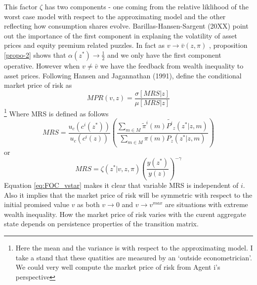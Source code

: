 \documentclass[12pt]{article}
\newtheorem{proposition}{Proposition}
\begin{document}


This factor $\zeta$ has two components - one coming from the relative liklihood of the worst case model with respect to the approximating model and the other reflecting how consumption shares evolve. Barillas-Hansen-Sargent (20XX) point out the importance of the first component in explaning the volatility of asset prices and equity premium related puzzles. In fact as $v\to \bar{v}(z,\pi)$ , proposition \ref{propo-2} shows that $\alpha(z^*)\to \frac{1}{2}$ and we only have the first component operative. However when $v\neq \bar{v}$ we have the feedback from wealth inequality to asset prices. 
Following Hansen and Jagannathan (1991), define the conditional market price of risk as 
\[MPR(v,z)=\frac{\sigma[MRS|z]}{\mu[MRS|z]}\] \footnote{Here the mean and the variance is with respect to the approximating model. I take a stand that these quatities are measured by an `outside econometrician'. We could very well compute the market price of risk from Agent i's perspective}
Where MRS is defined as follows
\[MRS=\frac{u_c(c^i(z^*))}{u_c(c^i(z))}\left(\frac{\sum_{m \in M}\tilde{\pi}^{i}(m)\tilde{P^i}_z(z^* |z,m)}{\sum_{m \in M}{\pi(m)P_{z}(z^*|z,m)}} \right)\] 
or
\begin{equation}
MRS=\zeta(z^*|v,z,\pi)\left(\frac{y(z^*)}{y(z)}\right)^{-\gamma}
\end{equation}
%
Equation \ref{eq:FOC_vstar} makes it clear that variable MRS is independent of $i$. Also it implies that the market price of risk will be symmetric with respect to the initial promised value $v$ as both  $v \to 0$ and $v \to v^{max}$ are situations with extreme wealth inequality. How the market price of risk varies with the curent aggregate state depends on persistence properties of the transition matrix. 
\end{document}
